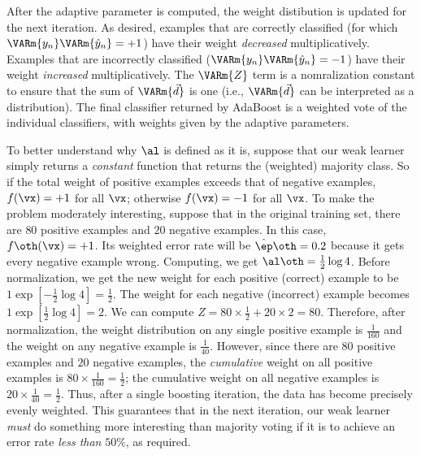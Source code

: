 After the adaptive parameter is computed, the weight distibution is
updated for the next iteration.  As desired, examples that are
correctly classified (for which $\VARm{y_n} \VARm{\hat y_n} = +1$)
have their weight \emph{decreased} multiplicatively.  Examples that
are incorrectly classified ($\VARm{y_n} \VARm{\hat y_n} = -1$) have
their weight \emph{increased} multiplicatively.  The $\VARm{Z}$ term
is a nomralization constant to ensure that the sum of $\VARm{\vec d}$
is one (i.e., $\VARm{\vec d}$ can be interpreted as a distribution).
The final classifier returned by AdaBoost is a weighted vote of the
individual classifiers, with weights given by the adaptive parameters.

To better understand why $\al$ is defined as it is, suppose that our
weak learner simply returns a \emph{constant} function that returns
the (weighted) majority class.  So if the total weight of positive
examples exceeds that of negative examples, $f(\vx) = +1$ for all
$\vx$; otherwise $f(\vx) = -1$ for all $\vx$.  To make the problem
moderately interesting, suppose that in the original training set,
there are $80$ positive examples and $20$ negative examples.  In this
case, $f\oth(\vx)=+1$.  Its weighted error rate will be $\hat\ep\oth
= 0.2$ because it gets every negative example wrong.  Computing, we
get $\al\oth = \frac12\log 4$.  Before normalization, we get the new
weight for each positive (correct) example to be $1 \exp[-\frac12\log
4] = \frac12$.  The weight for each negative (incorrect) example
becomes $1 \exp[\frac12\log 4] = 2$.  We can compute $Z = 80 \times
\frac 1 2 + 20 \times 2 = 80$.  Therefore, after normalization, the
weight distribution on any single positive example is $\frac 1 {160}$
and the weight on any negative example is $\frac 1 {40}$.  However,
since there are $80$ positive examples and $20$ negative examples, the
\emph{cumulative} weight on all positive examples is $80 \times \frac
1 {160} = \frac 1 2$; the cumulative weight on all negative examples
is $20 \times \frac 1{40} = \frac12$.  Thus, after a single boosting
iteration, the data has become precisely evenly weighted.  This
guarantees that in the next iteration, our weak learner \emph{must} do
something more interesting than majority voting if it is to achieve an
error rate \emph{less than} $50\%$, as required.


